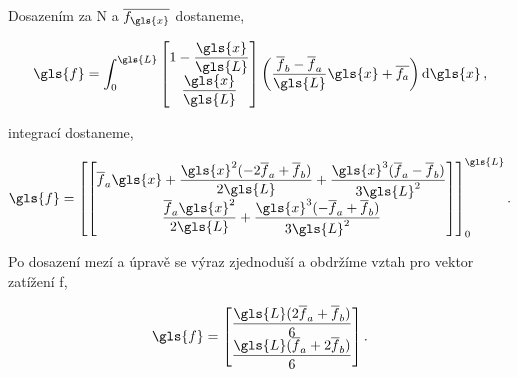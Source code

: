 Dosazením za \gls{N} a $\overline{f_{\gls{x}}}$ dostaneme,

\begin{equation}
    \gls{f} 
    = \int_{0}^{\gls{L}} 
    \begin{bmatrix}
        1 - \dfrac{\gls{x}}{\gls{L}} \\ \dfrac{\gls{x}}{\gls{L}} 
    \end{bmatrix}
    \left( \frac{\overline{f}_b - \overline{f}_a}{\gls{L}} \gls{x} + \overline{f_a} \right)
    \dd{\gls{x}},
\end{equation}

integrací dostaneme,

\begin{equation}
    \gls{f} 
    =
    \left[
    \begin{bmatrix}
        \overline{f}_a \gls{x} 
        + \dfrac{\gls{x}^2 (-2\overline{f}_a + \overline{f}_b)}{2\gls{L}}
        + \dfrac{\gls{x}^3 (\overline{f}_a - \overline{f}_b)}{3\gls{L}^2}
        \\
        \dfrac{\overline{f}_a \gls{x}^2}{2 \gls{L}}
        + \dfrac{\gls{x}^3(-\overline{f}_a+\overline{f}_b)}{3\gls{L}^2}
    \end{bmatrix}
    \right]_{0}^{\gls{L}}.
\end{equation}

Po dosazení mezí a úpravě se výraz zjednoduší a obdržíme vztah pro vektor zatížení \gls{f},

\begin{equation}
    \gls{f}
    =
    \begin{bmatrix}
        \dfrac{\gls{L}(2\overline{f}_a+\overline{f}_b)}{6} \\
        \dfrac{\gls{L}(\overline{f}_a+2\overline{f}_b)}{6}
    \end{bmatrix}.
\end{equation}
